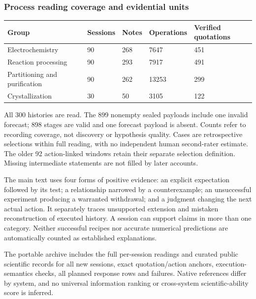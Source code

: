 \documentclass[10pt,a4paper]{article}
\begin{document}
\subsubsection{Process reading coverage and evidential units}\label{process-reading-coverage-and-evidential-units}

{\def\LTcaptype{table} %
\small\begin{longtable}[]{@{}lllll@{}}
\toprule\noalign{}
Group & Sessions & Notes & Operations & Verified quotations \\
\midrule\noalign{}
\endhead
\bottomrule\noalign{}
\endlastfoot
Electrochemistry & 90 & 268 & 7647 & 451 \\
Reaction processing & 90 & 293 & 7917 & 491 \\
Partitioning and purification & 90 & 262 & 13253 & 299 \\
Crystallization & 30 & 50 & 3105 & 122 \\
\end{longtable}\normalsize
}

All 300 histories are read. The 899 nonempty sealed payloads include one invalid forecast; 898 stages are valid and one forecast payload is absent. Counts refer to recording coverage, not discovery or hypothesis quality. Cases are retrospective selections within full reading, with no independent human second-rater estimate. The older 92 action-linked windows retain their separate selection definition. Missing intermediate statements are not filled by later accounts.

The main text uses four forms of positive evidence: an explicit expectation followed by its test; a relationship narrowed by a counterexample; an unsuccessful experiment producing a warranted withdrawal; and a judgment changing the next actual action. It separately traces unsupported extension and mistaken reconstruction of executed history. A session can support claims in more than one category. Neither successful recipes nor accurate numerical predictions are automatically counted as established explanations.

The portable archive includes the full per-session readings and curated public scientific records for all new sessions, exact quotation/action anchors, execution-semantics checks, all planned response rows and failures. Native references differ by system, and no universal information ranking or cross-system scientific-ability score is inferred.

\clearpage
\end{document}
